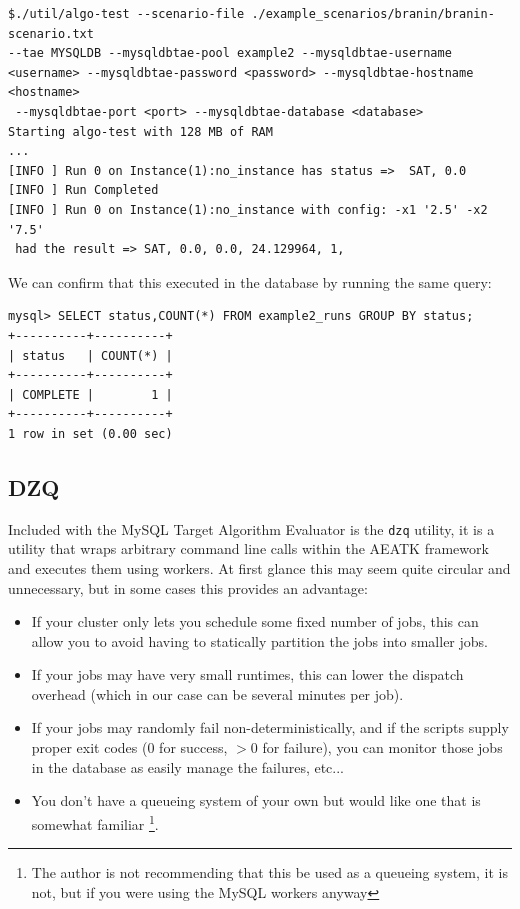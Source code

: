 \documentclass[11pt,letterpaper,oneside]{article}
\begin{document}
\begin{verbatim}
$./util/algo-test --scenario-file ./example_scenarios/branin/branin-scenario.txt 
--tae MYSQLDB --mysqldbtae-pool example2 --mysqldbtae-username 
<username> --mysqldbtae-password <password> --mysqldbtae-hostname <hostname>
 --mysqldbtae-port <port> --mysqldbtae-database <database>
Starting algo-test with 128 MB of RAM
...
[INFO ] Run 0 on Instance(1):no_instance has status =>  SAT, 0.0
[INFO ] Run Completed
[INFO ] Run 0 on Instance(1):no_instance with config: -x1 '2.5' -x2 '7.5'
 had the result => SAT, 0.0, 0.0, 24.129964, 1,
\end{verbatim}

We can confirm that this executed in the database by running the same query:

\begin{verbatim}
mysql> SELECT status,COUNT(*) FROM example2_runs GROUP BY status; 
+----------+----------+
| status   | COUNT(*) |
+----------+----------+
| COMPLETE |        1 |
+----------+----------+
1 row in set (0.00 sec)
\end{verbatim}


\subsection{DZQ}

Included with the MySQL Target Algorithm Evaluator is the \texttt{dzq} utility, it is a utility that wraps arbitrary command line calls within the AEATK framework and executes them using workers.  At first glance this may seem quite circular and unnecessary, but in some cases this provides an advantage:

\begin{itemize}

\item If your cluster only lets you schedule some fixed number of jobs, this can allow you to avoid having to statically partition the jobs into smaller jobs.
\item If your jobs may have very small runtimes, this can lower the dispatch overhead (which in our case can be several minutes per job).
\item If your jobs may randomly fail non-deterministically, and if the scripts supply proper exit codes (0 for success, $>0$ for failure), you can monitor those jobs in the database as easily manage the failures, etc...
\item You don't have a queueing system of your own but would like one that is somewhat familiar \footnote{The author is not recommending that this be used as a queueing system, it is not, but if you were using the MySQL workers anyway}.
\end{itemize}
\end{document}
